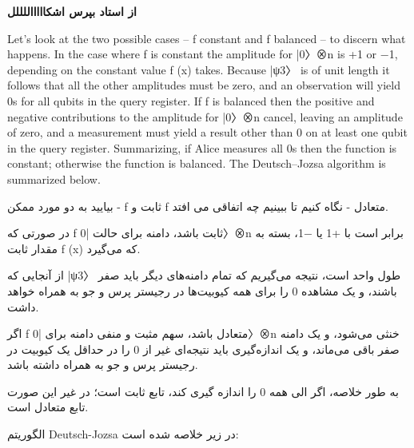\documentclass{book}
\begin{document}
	
	
	
	
	\textbf{از استاد بپرس اشکاااااللللل}
	
	Let’s look at the two possible cases – f constant and f balanced – to
	discern what happens. In the case where f is constant the amplitude for |0〉⊗n is +1 or
	−1, depending on the constant value f (x) takes. Because |ψ3〉 is of unit length it follows
	that all the other amplitudes must be zero, and an observation will yield 0s for all qubits
	in the query register. If f is balanced then the positive and negative contributions to the
	amplitude for |0〉⊗n cancel, leaving an amplitude of zero, and a measurement must yield
	a result other than 0 on at least one qubit in the query register. Summarizing, if Alice measures all 0s then the function is constant; otherwise the function is balanced. The
	Deutsch–Jozsa algorithm is summarized below.
	
	
	بیایید به دو مورد ممکن - f ثابت و f متعادل - نگاه کنیم تا ببینیم چه اتفاقی می افتد.
	
	در صورتی که f ثابت باشد، دامنه برای حالت |0〉⊗n برابر است با +1 یا −1، بسته به مقدار ثابت f (x) که می‌گیرد.
	
	از آنجایی که |ψ3〉 طول واحد است، نتیجه می‌گیریم که تمام دامنه‌های دیگر باید صفر باشند، و یک مشاهده 0 را برای همه کیوبیت‌ها در رجیستر پرس و جو به همراه خواهد داشت.
	
	اگر f متعادل باشد، سهم مثبت و منفی دامنه برای |0〉⊗n خنثی می‌شود، و یک دامنه صفر باقی می‌ماند، و یک اندازه‌گیری باید نتیجه‌ای غیر از 0 را در حداقل یک کیوبیت در رجیستر پرس و جو به همراه داشته باشد.
	
	به طور خلاصه، اگر الی همه 0 را اندازه گیری کند، تابع ثابت است؛ در غیر این صورت تابع متعادل است.
	
	الگوریتم Deutsch-Jozsa در زیر خلاصه شده است:
	
	
	
	
	
\end{document}
